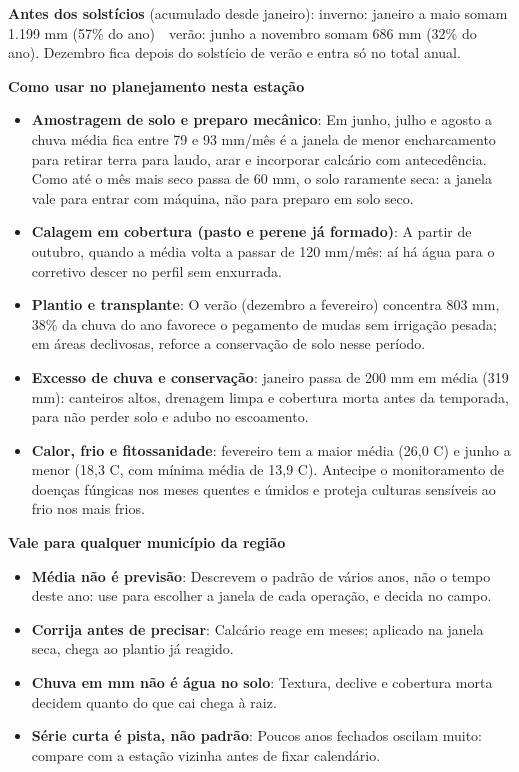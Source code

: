 \documentclass[10pt,a4paper]{article}
\begin{document}
\vspace{1pt}
{\footnotesize\textbf{Antes dos solstícios} (acumulado desde janeiro):
inverno: janeiro a maio somam 1.199 mm (57\% do ano) \,\textbullet\, verão: junho a novembro somam 686 mm (32\% do ano). Dezembro fica depois do solstício de verão e entra só no total
anual.}

\vspace{2pt}
{\bfseries\small Como usar no planejamento nesta estação}

\footnotesize\begin{itemize}\setlength{\itemsep}{0.5pt}
  \item \textbf{Amostragem de solo e preparo mecânico}: Em junho, julho e agosto a chuva média fica entre 79 e 93 mm/mês \textemdash{} é a janela de menor encharcamento para retirar terra para laudo, arar e incorporar calcário com antecedência. Como até o mês mais seco passa de 60 mm, o solo raramente seca: a janela vale para entrar com máquina, não para preparo em solo seco.
  \item \textbf{Calagem em cobertura (pasto e perene já formado)}: A partir de outubro, quando a média volta a passar de 120 mm/mês: aí há água para o corretivo descer no perfil sem enxurrada.
  \item \textbf{Plantio e transplante}: O verão (dezembro a fevereiro) concentra 803 mm, 38\% da chuva do ano \textemdash{} favorece o pegamento de mudas sem irrigação pesada; em áreas declivosas, reforce a conservação de solo nesse período.
  \item \textbf{Excesso de chuva e conservação}: janeiro passa de 200 mm em média (319 mm): canteiros altos, drenagem limpa e cobertura morta antes da temporada, para não perder solo e adubo no escoamento.
  \item \textbf{Calor, frio e fitossanidade}: fevereiro tem a maior média (26,0 \textdegree{}C) e junho a menor (18,3 \textdegree{}C, com mínima média de 13,9 \textdegree{}C). Antecipe o monitoramento de doenças fúngicas nos meses quentes e úmidos e proteja culturas sensíveis ao frio nos mais frios.
\end{itemize}

\vspace{1pt}
{\bfseries\small Vale para qualquer município da região}

\scriptsize\begin{itemize}\setlength{\itemsep}{0.5pt}
  \item \textbf{Média não é previsão}: Descrevem o padrão de vários anos, não o tempo deste ano: use para escolher a janela de cada operação, e decida no campo.
  \item \textbf{Corrija antes de precisar}: Calcário reage em meses; aplicado na janela seca, chega ao plantio já reagido.
  \item \textbf{Chuva em mm não é água no solo}: Textura, declive e cobertura morta decidem quanto do que cai chega à raiz.
  \item \textbf{Série curta é pista, não padrão}: Poucos anos fechados oscilam muito: compare com a estação vizinha antes de fixar calendário.
\end{itemize}
\end{document}
